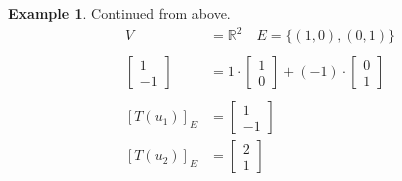 \documentclass{report}
\theoremstyle{definition}
\newtheorem{ex}{Example}[section]
\theoremstyle{remark}
\begin{document}
\begin{ex} Continued from above.
\begin{align*}
 V&=\mathbb{R}^2 \quad E=\{(1,0),(0,1)\} \\
 & \\
 \begin{bmatrix}
 1 \\ -1
 \end{bmatrix}&=1\cdot
 \begin{bmatrix}
 1 \\ 0
 \end{bmatrix}+(-1)\cdot
 \begin{bmatrix}
 0 \\ 1
 \end{bmatrix} \\
 & \\
 [T(u_1)]_E&=\begin{bmatrix}
 1 \\ -1
 \end{bmatrix} \\
 [T(u_2)]_E&=\begin{bmatrix}
 2 \\ 1
 \end{bmatrix}
\end{align*}
\end{ex}
\end{document}
